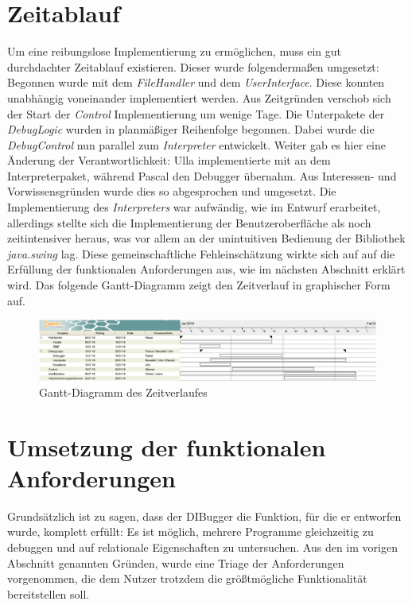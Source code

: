 \documentclass[parskip=full]{scrartcl}
\begin{document}
\section{Zeitablauf}
Um eine reibungslose Implementierung zu ermöglichen, muss ein gut durchdachter Zeitablauf existieren.
Dieser wurde folgendermaßen umgesetzt:\\
Begonnen wurde mit dem \textit{FileHandler} und dem \textit{UserInterface}. Diese konnten unabhängig voneinander implementiert werden.
Aus Zeitgründen verschob sich der Start der \textit{Control} Implementierung um wenige Tage.
Die Unterpakete der \textit{DebugLogic} wurden in planmäßiger Reihenfolge begonnen. Dabei wurde die \textit{DebugControl} nun parallel zum \textit{Interpreter} entwickelt.
Weiter gab es hier eine Änderung der Verantwortlichkeit: Ulla implementierte mit an dem Interpreterpaket, während Pascal den Debugger übernahm.
Aus Interessen- und Vorwissensgründen wurde dies so abgesprochen und umgesetzt.
Die Implementierung des \textit{Interpreters} war aufwändig, wie im Entwurf erarbeitet, allerdings stellte sich die Implementierung der Benutzeroberfläche als noch zeitintensiver heraus, was vor allem an der unintuitiven Bedienung der Bibliothek \textit{java.swing} lag. Diese gemeinschaftliche Fehleinschätzung wirkte sich auf auf die Erfüllung der funktionalen Anforderungen aus, wie im nächsten Abschnitt erklärt wird.
Das folgende Gantt-Diagramm zeigt den Zeitverlauf in graphischer Form auf.
\begin{figure}[!h]
\centering
\includegraphics[width=1.0\textwidth]{ganntDiagramm_neu_2_crop.pdf}
\caption{Gantt-Diagramm des Zeitverlaufes}
\end{figure}

\section{Umsetzung der funktionalen Anforderungen}
Grundsätzlich ist zu sagen, dass der DIBugger die Funktion, für die er entworfen wurde, komplett erfüllt: Es ist möglich, mehrere Programme gleichzeitig zu debuggen und auf relationale Eigenschaften zu untersuchen.
Aus den im vorigen Abschnitt genannten Gründen, wurde eine Triage der Anforderungen vorgenommen, die dem Nutzer trotzdem die größtmögliche Funktionalität bereitstellen soll.
\end{document}
